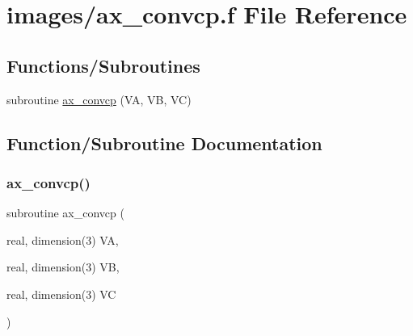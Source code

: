 \hypertarget{ax__convcp_8f}{}\section{images/ax\+\_\+convcp.f File Reference}
\label{ax__convcp_8f}
\subsection*{Functions/\+Subroutines}
\begin{DoxyCompactItemize}
\item 
subroutine \hyperlink{ax__convcp_8f_ad513ede8504a9405a8d143bde8bc985e}{ax\+\_\+convcp} (VA, VB, VC)
\end{DoxyCompactItemize}


\subsection{Function/\+Subroutine Documentation}
\mbox{\label{ax__convcp_8f_ad513ede8504a9405a8d143bde8bc985e}} 
\subsubsection{\texorpdfstring{ax\+\_\+convcp()}{ax\_convcp()}}
{\footnotesize\ttfamily subroutine ax\+\_\+convcp (\begin{DoxyParamCaption}\item[{real, dimension(3)}]{VA,  }\item[{real, dimension(3)}]{VB,  }\item[{real, dimension(3)}]{VC }\end{DoxyParamCaption})}

